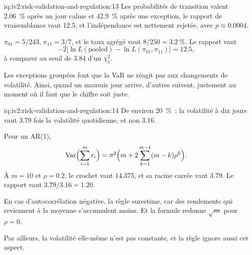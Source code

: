 \begin{solution}{iq:iv2:risk-validation-and-regulation:13}
Les probabilités de transition valent 2.06~\% après un jour calme et 42.9~\% après une exception, le rapport de vraisemblance vaut 12.5, et l'indépendance est nettement rejetée, avec $p \approx 0.0004$.

$\pi_{01} = 5/243$, $\pi_{11} = 3/7$, et le taux agrégé vaut $8/250 = 3.2~\%$. Le rapport vaut
\[
-2\bigl[\ln L(\text{pooled}) - \ln L(\pi_{01}, \pi_{11})\bigr] = 12.5,
\]
à comparer au seuil de 3.84 d'un $\chi^2_1$.

Les exceptions groupées font que la VaR ne réagit pas aux changements de volatilité. Ainsi, quand un mauvais jour arrive, d'autres suivent, justement au moment où il faut que le chiffre soit juste.

\end{solution}

\begin{solution}{iq:iv2:risk-validation-and-regulation:14}
De environ 20~\%~: la volatilité à dix jours vaut 3.79 fois la volatilité quotidienne, et non 3.16.

Pour un AR(1),
\[
\mathrm{Var}\Bigl(\sum_{i=1}^{m} r_i\Bigr) = \sigma^2\Bigl(m + 2\sum_{k=1}^{m-1}(m - k)\rho^k\Bigr).
\]
À $m = 10$ et $\rho = 0.2$, le crochet vaut 14.375, et sa racine carrée vaut 3.79. Le rapport vaut $3.79/3.16 = 1.20$.

En cas d'autocorrélation négative, la règle surestime, car des rendements qui reviennent à la moyenne s'accumulent moins. Et la formule redonne $\sqrt{m}$ pour $\rho = 0$.

Par ailleurs, la volatilité elle-même n'est pas constante, et la règle ignore aussi cet aspect.

\end{solution}

